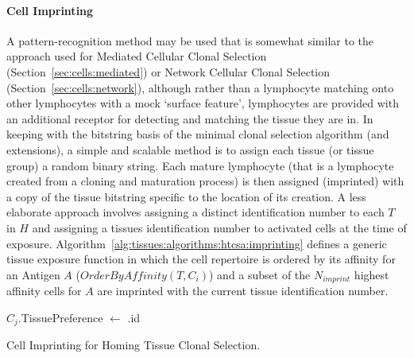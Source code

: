 \paragraph{Cell Imprinting}
A pattern-recognition method may be used that is somewhat similar to the approach used for Mediated Cellular Clonal Selection (Section~\ref{sec:cells:mediated}) or Network Cellular Clonal Selection (Section~\ref{sec:cells:network}), although rather than a lymphocyte matching onto other lymphocytes with a mock `surface feature', lymphocytes are provided with an additional receptor for detecting and matching the tissue they are in. In keeping with the bitstring basis of the minimal clonal selection algorithm (and extensions), a simple and scalable method is to assign each tissue (or tissue group) a random binary string. Each mature lymphocyte (that is a lymphocyte created from a cloning and maturation process) is then assigned (imprinted) with a copy of the tissue bitstring specific to the location of its creation. A less elaborate approach involves assigning a distinct identification number to each $T$ in $H$ and assigning a tissues identification number to activated cells at the time of exposure. Algorithm~\ref{alg:tissues:algorithms:htcsa:imprinting} defines a generic tissue exposure function in which the cell repertoire is ordered by its affinity for an Antigen $A$ ($OrderByAffinity(T, C_i)$) and a subset of the $N_{imprint}$ highest affinity cells for $A$ are imprinted with the current tissue identification number.

\begin{algorithm}[ht]
  \SetLine
	
  
	{
		{
			\;		
		}
		\;		
		{
			$C_j$.TissuePreference $\leftarrow$ \Tissue.id\;
		}
	}
	\caption{Cell Imprinting for Homing Tissue Clonal Selection.}
	\label{alg:tissues:algorithms:htcsa:imprinting}
\end{algorithm}

%
%
